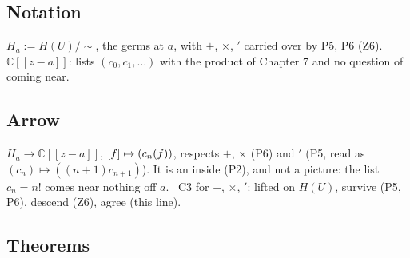 \subsection*{Notation}

\begin{lines}
\item[\lab{N1}] $H_a := H(U)/{\sim}$, the germs at $a$, with $+$, $\times$, $'$ carried over by P5, P6 (Z6). \ $\mathbb{C}[[z - a]]$: lists $(c_0, c_1, \dots)$ with the product of Chapter 7 and no question of coming near.
\end{lines}

\subsection*{Arrow}

\begin{lines}
\item[\lab{P8}] $H_a \to \mathbb{C}[[z - a]]$, $[f] \mapsto (c_n(f))$, respects $+$, $\times$ (P6) and $'$ (P5, read as $(c_n) \mapsto ((n+1) c_{n+1})$). It is an inside (P2), and not a picture: the list $c_n = n!$ comes near nothing off $a$. \ C3 for $+$, $\times$, $'$: lifted on $H(U)$, survive (P5, P6), descend (Z6), agree (this line).
\end{lines}

\subsection*{Theorems}

